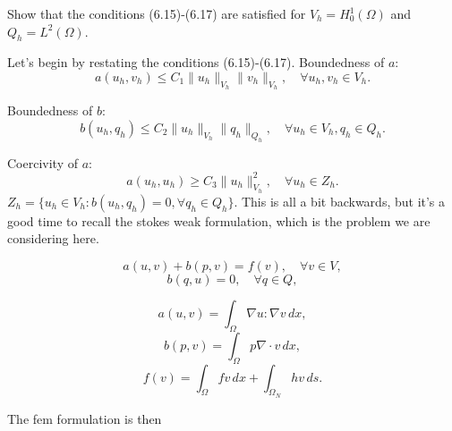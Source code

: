 \documentclass[a4paper,12pt]{article}
\theoremstyle{exerciseStyle}
\theoremstyle{solutionStyle}
\begin{document}
\begin{exercise}{6.1}
    Show that the conditions (6.15)-(6.17) are satisfied for $V_h = H^1_0(\Omega)$ and $Q_h = L^2(\Omega)$.
\end{exercise}

\begin{solution}{6.1}
    Let's begin by restating the conditions (6.15)-(6.17).
    Boundedness of \( a \):
    \begin{equation}
        a(u_h, v_h) \leq C_1 \| u_h \|_{V_h} \| v_h \|_{V_h}, \quad \forall u_h, v_h \in V_h.
        \tag{6.15}
    \end{equation}

    Boundedness of \( b \):
    \begin{equation}
        b(u_h, q_h) \leq C_2 \| u_h \|_{V_h} \| q_h \|_{Q_h}, \quad \forall u_h \in V_h, q_h \in Q_h.
        \tag{6.16}
    \end{equation}

    Coercivity of \( a \):
    \begin{equation}
        a(u_h, u_h) \geq C_3 \| u_h \|^2_{V_h}, \quad \forall u_h \in Z_h.
        \tag{6.17}
    \end{equation}
    $Z_h = \{ u_h \in V_h : b(u_h, q_h) = 0, \forall q_h \in Q_h \}$.
    \iffalse
        This is all a bit backwards, but it's a good time to recall the stokes weak formulation, which is the
        problem we are considering here.


        \begin{equation*}
            a(u, v) + b(p, v) = f(v), \quad \forall v \in V,
        \end{equation*}
        \begin{equation*}
            b(q, u) = 0, \quad \forall q \in Q,
        \end{equation*}

        \begin{equation*}
            a(u, v) = \int_{\Omega} \nabla u : \nabla v \, dx,
        \end{equation*}
        \begin{equation*}
            b(p, v) = \int_{\Omega} p \nabla \cdot v \, dx,
        \end{equation*}
        \begin{equation*}
            f(v) = \int_{\Omega} f v \, dx + \int_{\Omega_N} h v \, ds.
        \end{equation*}


        The fem formulation is then



\end{solution}
\end{document}
